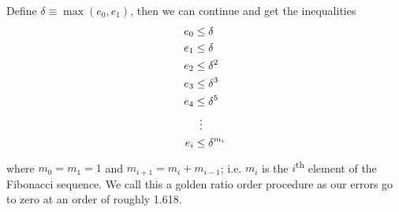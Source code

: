 \documentclass[12pt,letterpaper,DIV=11]{scrartcl}
\theoremstyle{plain}
\theoremstyle{definition}
\theoremstyle{remark}
\begin{document}
Define $\delta \equiv \max(e_0, e_1)$, then we can continue and get the inequalities \begin{align*}
  e_0 &\leq \delta \\
  e_1 &\leq \delta \\
  e_2 &\leq \delta^2 \\
  e_3 &\leq \delta^3 \\
  e_4 &\leq \delta^5 \\
      &\vdotswithin{\leq} \\
  e_i &\leq \delta^{m_i}
\end{align*} where $m_0 = m_1 = 1$ and $m_{i + 1} = m_i + m_{i - 1}$; i.e. $m_i$ is the $i$\textsuperscript{th} element of the Fibonacci sequence.
We call this a golden ratio order procedure as our errors go to zero at an order of roughly 1.618.
\end{document}

